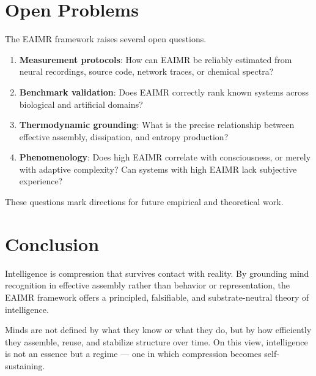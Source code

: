 \documentclass[11pt,letterpaper]{article}
\begin{document}
\section{Open Problems}

The EAIMR framework raises several open questions.

\begin{enumerate}
\item \textbf{Measurement protocols}: How can EAIMR be reliably estimated from neural recordings, source code, network traces, or chemical spectra?
\item \textbf{Benchmark validation}: Does EAIMR correctly rank known systems across biological and artificial domains?
\item \textbf{Thermodynamic grounding}: What is the precise relationship between effective assembly, dissipation, and entropy production?
\item \textbf{Phenomenology}: Does high EAIMR correlate with consciousness, or merely with adaptive complexity? Can systems with high EAIMR lack subjective experience?
\end{enumerate}

These questions mark directions for future empirical and theoretical work.

\section{Conclusion}

Intelligence is compression that survives contact with reality. By grounding mind recognition in effective assembly rather than behavior or representation, the EAIMR framework offers a principled, falsifiable, and substrate-neutral theory of intelligence.

Minds are not defined by what they know or what they do, but by how efficiently they assemble, reuse, and stabilize structure over time. On this view, intelligence is not an essence but a regime — one in which compression becomes self-sustaining.
\end{document}

